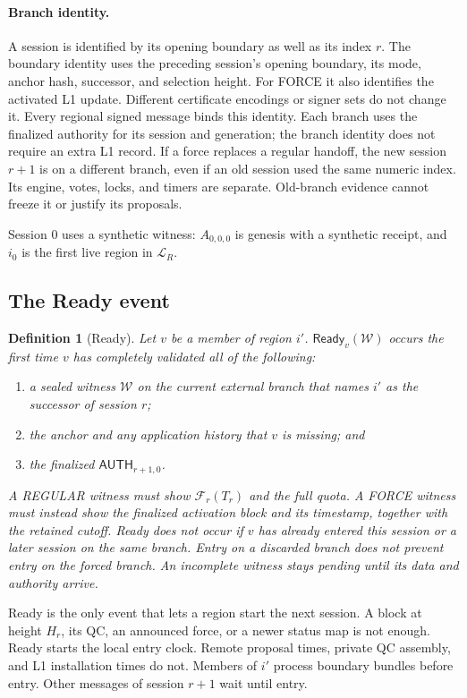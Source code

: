 \documentclass[11pt,a4paper]{article}
\newcommand{\FC}{\mathcal F}
\newcommand{\tagg}[1]{\ensuremath{\mathsf{#1}}}
\newtheorem{definition}{Definition}[section]
\begin{document}
\paragraph{Branch identity.}
A session is identified by its opening boundary as well as its index
$r$. The boundary identity uses the preceding session's opening boundary,
its mode, anchor hash, successor, and selection height. For FORCE it
also identifies the activated L1 update. Different certificate encodings or signer sets do not change it.
Every regional signed message binds this identity. Each branch uses
the finalized authority for its session and generation; the branch
identity does not require an extra L1 record. If a force replaces
a regular handoff, the new session $r+1$ is on a different branch, even
if an old session used the same numeric index. Its engine, votes, locks,
and timers are separate. Old-branch evidence cannot freeze it or justify
its proposals.

Session $0$ uses a synthetic witness: $A_{0,0,0}$ is genesis with a
synthetic receipt, and $i_0$ is the first live region in $\mathcal L_R$.

\subsection{The Ready event}
\label{sec:ready}
\begin{definition}[Ready]
\label{def:ready}
Let $v$ be a member of region $i'$. $\tagg{Ready}_v(\mathcal W)$ occurs
the first time $v$ has completely validated all of the following:
\begin{enumerate}[label=(\roman*)]
\item a sealed witness $\mathcal W$ on the current external branch
that names $i'$ as the successor of session $r$;
\item the anchor and any application history that $v$ is missing; and
\item the finalized $\tagg{AUTH}_{r+1,0}$.
\end{enumerate}
A REGULAR witness must show $\FC_r(T_r)$ and the full quota. A FORCE
witness must instead show the finalized activation block and its
timestamp, together with the retained cutoff. Ready does not occur if
$v$ has already entered this session or a later session on the same
branch. Entry on a discarded branch does not prevent entry on the
forced branch. An incomplete witness stays pending
until its data and authority arrive.
\end{definition}
Ready is the only event that lets a region start the next session. A
block at height $H_r$, its QC, an announced force, or a newer status map
is not enough. Ready starts the local entry clock. Remote proposal
times, private QC assembly, and L1 installation times do not. Members of
$i'$ process boundary bundles before entry. Other messages of session
$r+1$ wait until entry.
\end{document}
